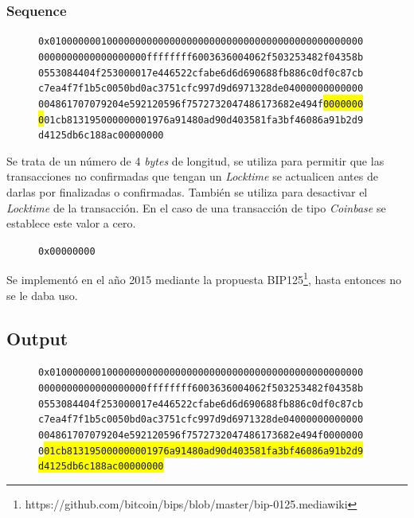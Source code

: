 \documentclass{article}
\begin{document}
    \subsubsection{Sequence}
    
    \begin{figure}[H]
        \texttt{0x0100000001000000000000000000000000000000000000000000000} \\
        \texttt{0000000000000000000ffffffff6003636004062f503253482f04358b} \\
        \texttt{0553084404f253000017e446522cfabe6d6d690688fb886c0df0c87cb} \\
        \texttt{c7ea4f7f1b5c0050bd0ac3751cfc997d9d6971328de04000000000000} \\
        \texttt{004861707079204e592120596f7572732047486173682e494f\colorbox{Yellow}{0000000}} \\
        \texttt{\colorbox{Yellow}{0}01cb813195000000001976a91480ad90d403581fa3bf46086a91b2d9} \\
        \texttt{d4125db6c188ac00000000}
    \end{figure}
    
    Se trata de un número de 4 \textit{bytes} de longitud, se utiliza para permitir que las transacciones no confirmadas que tengan un \textit{Locktime} se actualicen antes de darlas por finalizadas o confirmadas. También se utiliza para desactivar el \textit{Locktime} de la transacción. En el caso de una transacción de tipo \textit{Coinbase} se establece este valor a cero.
    \begin{figure}[H]
        \texttt{0x00000000}
    \end{figure}
    Se implementó en el año 2015 mediante la propuesta BIP125\footnote{https://github.com/bitcoin/bips/blob/master/bip-0125.mediawiki}, hasta entonces no se le daba uso.
    
    \subsection{Output}
    
    \begin{figure}[H]
        \texttt{0x0100000001000000000000000000000000000000000000000000000} \\
        \texttt{0000000000000000000ffffffff6003636004062f503253482f04358b} \\
        \texttt{0553084404f253000017e446522cfabe6d6d690688fb886c0df0c87cb} \\
        \texttt{c7ea4f7f1b5c0050bd0ac3751cfc997d9d6971328de04000000000000} \\
        \texttt{004861707079204e592120596f7572732047486173682e494f0000000} \\
        \texttt{0\colorbox{Yellow}{01cb813195000000001976a91480ad90d403581fa3bf46086a91b2d9}} \\
        \texttt{\colorbox{Yellow}{d4125db6c188ac00000000}}
    \end{figure}
    
\end{document}
